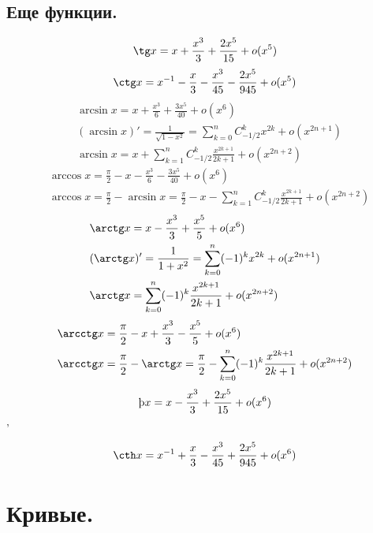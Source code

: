 \documentclass[a4paper,14pt]{article}
\begin{document}
    \subsection{Еще функции.}
    \begin{align}
        \tg x = x+\frac{x^3}{3}+\frac{2x^5}{15}+o(x^5)
    \end{align}
    \begin{align}
        \ctg x = x^{-1}-\frac{x}{3}-\frac{x^3}{45}-\frac{2x^5}{945}+o(x^5)
    \end{align}
    \begin{align}
        &\arcsin x=x+\frac{x^3}{6}+\frac{3x^5}{40}+o(x^6)\nonumber \\
        &(\arcsin x)'=\frac{1}{\sqrt{1-x^2}}=\sum_{k=0}^n C_{-1/2}^k x^{2k}+o(x^{2n+1}) \nonumber \\
        &\arcsin x =x+\sum_{k=1}^n C_{-1/2}^k \frac{x^{2k+1}}{2k+1}+o(x^{2n+2})
    \end{align}
    \begin{align}
        &\arccos x=\frac{\pi}{2}-x-\frac{x^3}{6}-\frac{3x^5}{40}+o(x^6)\nonumber \\
        &\arccos x=\frac{\pi}{2}-\arcsin x=\frac{\pi}{2}-x-\sum_{k=1}^n C_{-1/2}^k \frac{x^{2k+1}}{2k+1}+o(x^{2n+2})
    \end{align}
    \begin{align}
        &\arctg x = x-\frac{x^3}{3}+\frac{x^5}{5}+o(x^6) \nonumber \\
        &(\arctg x)' =\frac{1}{1+x^2}=\sum_{k=0}^n (-1)^k x^{2k}+o(x^{2n+1}) \nonumber \\
        &\arctg x=\sum_{k=0}^n (-1)^k \frac{x^{2k+1}}{2k+1}+o(x^{2n+2})
    \end{align}
    \begin{align}
        &\arcctg x = \frac{\pi}{2}-x+\frac{x^3}{3}-\frac{x^5}{5}+o(x^6) \nonumber \\
        &\arcctg x=\frac{\pi}{2}-\arctg x=\frac{\pi}{2}-\sum_{k=0}^n (-1)^k \frac{x^{2k+1}}{2k+1}+o(x^{2n+2})
    \end{align}
    \begin{align}
        \th x=x-\frac{x^3}{3}+\frac{2x^5}{15}+o(x^6)
    \end{align}
    '\begin{align}
        \cth x = x^{-1}+\frac{x}{3}-\frac{x^3}{45}+\frac{2x^5}{945}+o(x^6)
    \end{align}
    \section{Кривые.}
\end{document}
